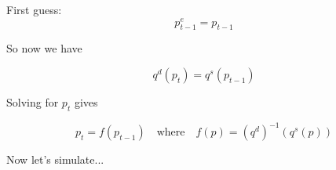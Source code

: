 \documentclass[
    xcolor={svgnames,dvipsnames},
    hyperref={colorlinks, citecolor=DeepPink4, linkcolor=DarkRed, urlcolor=DarkBlue}
    ]{beamer}  %
\newcommand{\1}{\mathbbm 1}
\begin{document}
\begin{frame}
    
    First guess:
    \begin{equation*}
        p^e_{t-1} = p_{t-1}
    \end{equation*}

    So now we have

    $$
        q^d(p_t) = q^s(p_{t-1})
    $$

    Solving for $p_t$ gives

    $$
        p_t = f(p_{t-1})
        \quad \text{where} \quad
        f(p) = (q^d)^{-1} (q^s(p))
    $$


    Now let's simulate...

\end{frame}

    


\begin{frame}
    
    \begin{figure}
        \centering
    \end{figure}

\end{frame}
\end{document}
